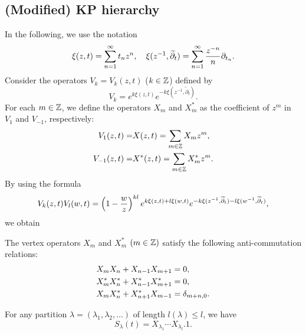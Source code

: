 \subsection{(Modified) KP hierarchy}
%
In the following, we use the notation
\begin{equation}
\xi(z,t)=\sum_{n=1}^{\infty} t_n z^n, \quad
\xi(z^{-1},\widetilde{\partial}_t)=\sum_{n=1}^{\infty} {z^{-n} \over n}
\partial_{t_n}.
\end{equation}
Consider the operators 
$V_k=V_k(z,t)$ ($k \in {\Bbb Z}$) defined by 
\begin{equation}
V_k=e^{k \xi(z,t)} e^{-k \xi(z^{-1},\widetilde{\partial}_t)}.
\end{equation}
%
For each $m\in {\Bbb Z}$, 
we define the operators $X_m$ and $X^{\ast}_m$ 
as the coefficient of $z^m$ in $V_1$ and $V_{-1}$,
respectively: 
\begin{align}
V_1(z,t)=&X(z,t)=\sum_{m \in {\Bbb Z}} X_m z^m,\\
V_{-1}(z,t)=&X^{\ast}(z,t)=\sum_{m \in {\Bbb Z}} X^{\ast}_{m} z^m.
\notag
\end{align}
%
By using the formula
\begin{equation}\label{normal-order}
V_k(z,t) V_l(w,t)= \left( 1-{w \over z} \right)^{k l} 
e^{k \xi(z,t)+l \xi(w,t)}
e^{-k \xi(z^{-1},\widetilde{\partial}_t)-l \xi(w^{-1},\widetilde{\partial}_t)},
\end{equation}
we obtain
\begin{lem}
The vertex operators $X_m$ and $X_m^\ast$ $(m\in{\Bbb Z})$ 
satisfy the following anti-commutation relations: 
\begin{align}
\label{comm}
X_{m} X_{n}+X_{n-1} X_{m+1}&=0, \notag\\
X^{\ast}_{m} X^{\ast}_{n}+
X^{\ast}_{n-1} X^{\ast}_{m+1}&=0, \\
X_{m} X^{\ast}_{n}+
X^{\ast}_{n+1} X_{m-1}&=\delta_{m+n,0}. \notag
\end{align}
\end{lem}
%
\begin{prop}\label{genS}
For any partition $\lambda=(\lambda_1,\lambda_2,\ldots)$ of 
length $l(\lambda)\le l$, we have
\begin{equation}
S_{\lambda}(t)=X_{\lambda_1} \cdots X_{\lambda_l} .1.
\end{equation}
\end{prop}
 
